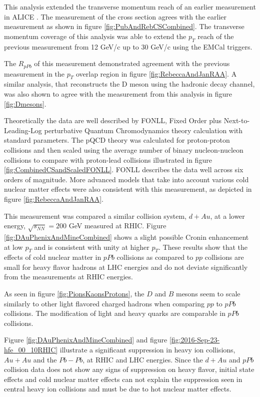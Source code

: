 This analysis extended the transverse momentum reach of an earlier measurement in ALICE \cite{Adam:2015qda}. The measurement of the cross section agrees with the earlier measurement as shown in figure \ref{fig:PubAndRebCSCombined}. The transverse momentum coverage of this analysis was able to extend the $p_{T}$ reach of the previous measurement from 12 GeV/c up to 30 GeV/c using the EMCal triggers. 

The $R_{pPb}$ of this measurement demonstrated agreement with the previous measurement in the $p_{T}$ overlap region in figure \ref{fig:RebeccaAndJanRAA}. A similar analysis, that reconstructs the D meson using the hadronic decay channel, was also shown to agree with the measurement from this analysis in figure \ref{fig:Dmesons}.

Theoretically the data are well described by FONLL, Fixed Order plus Next-to-Leading-Log perturbative Quantum Chromodynamics theory calculation with standard parameters. The pQCD theory was calculated for proton-proton collisions and then scaled using the average number of binary nucleon-nucleon collisions to compare with proton-lead collisions illustrated in figure \ref{fig:CombinedCSandScaledFONLL}. FONLL describes the data well across six orders of magnitude. More advanced models that take into account various cold nuclear matter effects were also consistent with this measurement, as depicted in figure \ref{fig:RebeccaAndJanRAA}.

This measurement was compared a similar collision system, $d+Au$, at a lower energy, $\sqrt{s_{NN}} = 200$ GeV measured at RHIC. Figure \ref{fig:DAuPhenixAndMineCombined} shows a slight possible Cronin enhancement at low $p_{T}$ and is consistent with unity at higher $p_{T}$. These results show that the effects of cold nuclear matter in $pPb$ collisions as compared to $pp$ collisions are small for heavy flavor hadrons at LHC energies and do not deviate significantly from the measurements at RHIC energies.

As seen in figure \ref{fig:PionsKaonsProtons}, the $D$ and $B$ mesons seem to scale similarly to other light flavored charged hadrons when comparing $pp$ to $pPb$ collisions. The modification of light and heavy quarks are comparable in $pPb$ collisions.

Figure \ref{fig:DAuPhenixAndMineCombined} and figure \ref{fig:2016-Sep-23-hfe_00_10RHIC} illustrate a significant suppression in heavy ion collisions, $Au+Au$ and the $Pb-Pb$, at RHIC and LHC energies. Since the $d+Au$ and $pPb$ collision data does not show any signs of suppression on heavy flavor, initial state effects and cold nuclear matter effects can not explain the suppression seen in central heavy ion collisions and must be due to hot nuclear matter effects.






